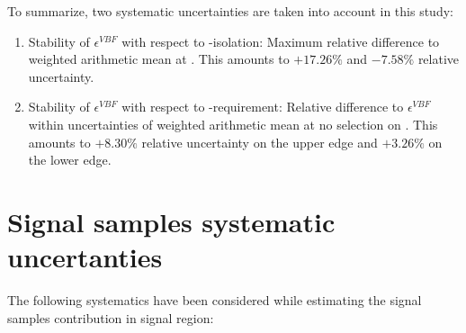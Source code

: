To summarize, two systematic uncertainties are taken into account in this study:

\begin{enumerate}
	\item Stability of $\epsilon^{VBF}$ with respect to \hadtau-isolation: Maximum relative difference to weighted arithmetic mean at \gev. This amounts to $+17.26\%$ and  $-7.58\%$ relative uncertainty.
	\item Stability of $\epsilon^{VBF}$ with respect to \met-requirement: Relative difference to $\epsilon^{VBF}$ within uncertainties of weighted arithmetic mean at no selection on \met. This amounts to $+8.30\%$ relative uncertainty on the upper edge and $+3.26\%$ on the lower edge.
\end{enumerate}


\clearpage

\section{Signal samples systematic uncertanties}
\label{sec:systematics}
\FloatBarrier

The following systematics have been considered while estimating the signal samples contribution in signal region:

